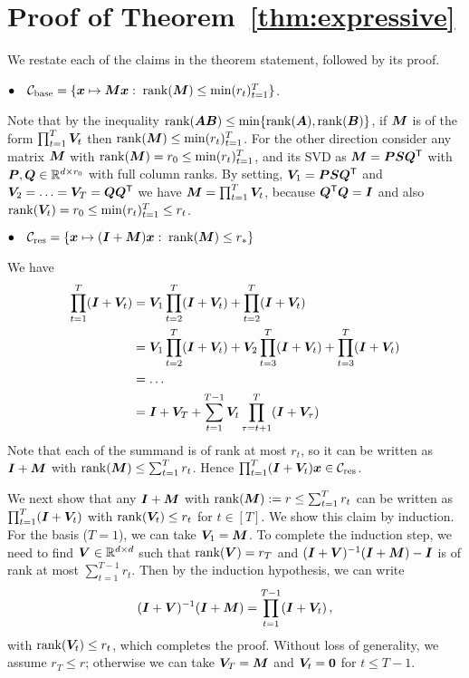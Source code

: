 \section{Proof of Theorem~\ref{thm:expressive}}
\label{proof:expressive}

%
We restate each of the claims in the theorem statement, followed by its proof.

$\bullet\quad \mathcal{C}_{{\rm base}} = \{\bm{x}\mapsto{\bm{M}}\bm{x}: \; \operatorname{rank}({\bm{M}})\le \min(r_t)_{t=1}^T\}$.

Note that by the inequality $\operatorname{rank}({\bm{A}}{\bm{B}})\le \min\{\operatorname{rank}({\bm{A}}),\operatorname{rank}({\bm{B}})\}$, if ${\bm{M}}$ is of the form $\prod_{t=1}^T {\bm{V}}_t$ then $\operatorname{rank}({\bm{M}})\le \min(r_t)_{t=1}^T$. For the other direction consider any matrix ${\bm{M}}$ with $\operatorname{rank}({\bm{M}})=r_0\le \min(r_t)_{t=1}^T$, and its SVD as ${\bm{M}}= {\bm{P}} {{\bm{S}}}{\bm{Q}}^{\sf T}$ with ${\bm{P}},{\bm{Q}}\in\mathbb{R}^{d\times r_0}$ with full column ranks. By setting, ${\bm{V}}_1 = {\bm{P}} {{\bm{S}}}{\bm{Q}}^{\sf T}$ and ${\bm{V}}_2=\dotsc ={\bm{V}}_T = {\bm{Q}}{\bm{Q}}^{\sf T}$ we have ${\bm{M}} = \prod_{t=1}^T {\bm{V}}_t$, because ${\bm{Q}}^{\sf T} {\bm{Q}}= \bm{I}$ and also $\operatorname{rank}({\bm{V}}_t) = r_0\le \min(r_t)_{t=1}^T \le r_t$.

\bigskip

$\bullet\quad \mathcal{C}_{{\rm res}} = \{\bm{x} \mapsto(\bm{I}+{\bm{M}})\bm{x}:\; \operatorname{rank}({\bm{M}})\le r_*\}$

We have 
\begin{align*}
    \prod_{t=1}^T (\bm{I}+{\bm{V}}_t) &= {\bm{V}}_1 \prod_{t=2}^T (\bm{I}+{\bm{V}}_t) + \prod_{t=2}^T (\bm{I}+{\bm{V}}_t) \\
    &= {\bm{V}}_1 \prod_{t=2}^T (\bm{I}+{\bm{V}}_t) + {\bm{V}}_2 \prod_{t=3}^T (\bm{I}+{\bm{V}}_t)+ \prod_{t=3}^T (\bm{I}+{\bm{V}}_t)\\
    &= \dotsc\\
    &= \bm{I} + {\bm{V}}_T+ \sum_{t=1}^{T-1} {\bm{V}}_t \prod_{\tau=t+1}^T (\bm{I}+{\bm{V}}_\tau) 
\end{align*}
Note that each of the summand is of rank at most $r_t$, so it can be written as $\bm{I}+{\bm{M}}$ with $\operatorname{rank}({\bm{M}})\le \sum_{t=1}^T r_t$. Hence $\prod_{t=1}^T (\bm{I}+{\bm{V}}_t)\bm{x}\in \mathcal{C}_{{\rm res}}$.

We next show that any $\bm{I}+{\bm{M}}$ with $\operatorname{rank}({\bm{M}}):= r\le \sum_{t=1}^T r_t$ can be written as $\prod_{t=1}^T (\bm{I}+{\bm{V}}_t)$ with $\operatorname{rank}({\bm{V}}_t)\le r_t$ for $t\in[T]$. We show this claim by induction. For the basis ($T=1$), 
we can take ${\bm{V}}_1 = {\bm{M}}$. 
To complete the induction step, we need to find ${\bm{V}}\in\mathbb{R}^{d\times d}$ such that $\operatorname{rank}({\bm{V}}) = r_T$ and $(\bm{I}+{\bm{V}})^{-1} (\bm{I}+{\bm{M}})-\bm{I}$ is of rank at most $\sum_{t=1}^{T-1}r_t$. Then by the induction hypothesis, we can write
\[
(\bm{I}+{\bm{V}})^{-1} (\bm{I}+{\bm{M}}) = \prod_{t=1}^{T-1}(\bm{I}+{\bm{V}}_t)\,,
\]
with $\operatorname{rank}({\bm{V}}_t) \le r_t$, which completes the proof. 
Without loss of generality, we assume $r_T\le r$; otherwise we can take ${\bm{V}}_T = {\bm{M}}$ and ${\bm{V}}_t = \bm{0}$ for $t\le T-1$.


